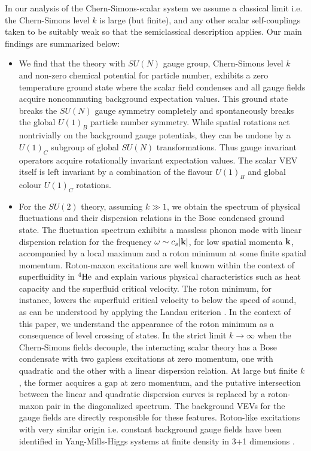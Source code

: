  In our analysis of the Chern-Simons-scalar system we  assume a classical limit i.e.  the Chern-Simons level $k$ is large (but finite), and any other scalar self-couplings taken to be  suitably weak so that the semiclassical description applies.  Our main findings are summarized below:
 \begin{itemize}
 \item{We find that the theory with $SU(N)$ gauge group, Chern-Simons level $k$ and non-zero chemical potential for particle number, exhibits a zero temperature ground state where  the scalar field condenses and all gauge fields acquire noncommuting background expectation values.  This ground state breaks the $SU(N)$ gauge symmetry completely and spontaneously breaks the global $U(1)_B$ particle number symmetry. While spatial rotations act nontrivially on the background gauge potentials, they  can be undone by a $U(1)_C$ subgroup of global $SU(N)$ transformations.  Thus gauge invariant operators acquire rotationally  invariant expectation values. The scalar VEV itself is left invariant by a combination of the flavour $U(1)_B$ and global colour $U(1)_C$ rotations. }
 \item{For the $SU(2)$ theory, assuming $k\gg 1$, we obtain the spectrum of physical fluctuations and their dispersion relations in the Bose condensed ground state. The fluctuation spectrum exhibits a massless phonon mode with linear dispersion relation 
 for the frequency $\omega\sim c_s |{\bf k}|$, for low spatial momenta ${\bf k}$, accompanied by a local maximum and a roton minimum at some finite spatial momentum.  Roton-maxon excitations are well known within the context of superfluidity in ${}^4{\rm He}$  \cite{Landau:1941vsj, Schmitt:2014eka} and explain various physical characteristics such as heat capacity and the superfluid critical velocity. The roton minimum, for instance, lowers the superfluid critical velocity to below the speed of sound, as can be understood by applying the Landau criterion \cite{Landau:1941vsj, Schmitt:2014eka}. In the context of this paper, we understand the appearance of the roton minimum as a consequence of level crossing of states. In the strict limit $k\to \infty$ when the Chern-Simons fields decouple, the interacting scalar theory has a Bose condensate with two gapless excitations at zero momentum, one with quadratic and the other with a linear dispersion relation. At  large but finite $k$, the former acquires a gap at zero momentum, and the putative intersection between the linear and quadratic dispersion curves is replaced by a roton-maxon pair in the diagonalized spectrum. The background VEVs for the gauge fields are directly responsible for these features. Roton-like excitations with very similar origin i.e. constant background gauge fields have been identified in Yang-Mills-Higgs systems at finite density in 3+1 dimensions \cite{Gusynin2004}.
 
}
\end{itemize}
